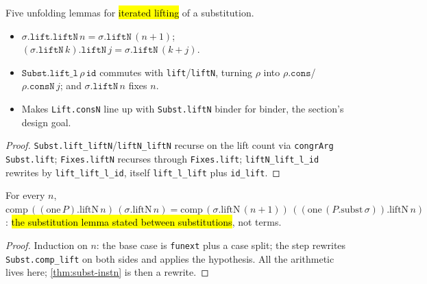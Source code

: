 \begin{lemma}
\label{fam:subst-liftn-algebra}
\leanok
{} 

 Five unfolding lemmas for \hl{iterated lifting} of a substitution.
\begin{itemize}
\item $\sigma.\texttt{lift}.\texttt{liftN}\,n = \sigma.\texttt{liftN}\,(n{+}1)$;
$(\sigma.\texttt{liftN}\,k).\texttt{liftN}\,j = \sigma.\texttt{liftN}\,(k{+}j)$.
\item $\texttt{Subst.lift\_l}\,\rho\,\texttt{id}$ commutes with \texttt{lift}/\texttt{liftN},
turning $\rho$ into $\rho.\texttt{cons}$/$\rho.\texttt{consN}\,j$; and
$\sigma.\texttt{liftN}\,n$ fixes $n$.
\item Makes \texttt{Lift.consN} line up with \texttt{Subst.liftN} binder for binder, the
section's design goal.
\end{itemize}
\end{lemma}
\begin{proof}
\leanok
{} \texttt{Subst.lift\_liftN}/\texttt{liftN\_liftN} recurse on the lift count via
\texttt{congrArg Subst.lift}; \texttt{Fixes.liftN} recurses through \texttt{Fixes.lift};
\texttt{liftN\_lift\_l\_id} rewrites by \texttt{lift\_lift\_l\_id}, itself
\texttt{lift\_l\_lift} plus \texttt{id\_lift}.
\end{proof}

\begin{lemma}
\label{thm:subst-comp-liftn-one}
\leanok
{} 

 For every $n$,
$\mathrm{comp}\,((\mathrm{one}\,P).\mathrm{liftN}\,n)\,(\sigma.\mathrm{liftN}\,n) = \mathrm{comp}\,(\sigma.\mathrm{liftN}\,(n{+}1))\,((\mathrm{one}\,(P.\mathrm{subst}\,\sigma)).\mathrm{liftN}\,n)$:
\hl{the substitution lemma stated between substitutions}, not terms.
\end{lemma}
\begin{proof}
\leanok
{} Induction on $n$: the base case is \texttt{funext} plus a case split; the step
rewrites \texttt{Subst.comp\_lift} on both sides and applies the hypothesis. All the
arithmetic lives here; \ref{thm:subst-instn} is then a rewrite.
\end{proof}

